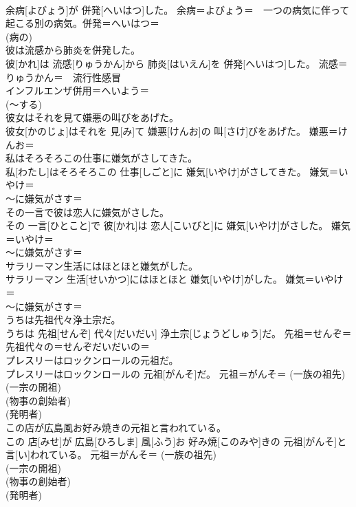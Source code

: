\documentclass[8pt]{extreport}
\begin{document}
\begin{CJK}{UTF8}{min}
{\\	余病[よびょう]が 併発[へいはつ]した。	余病＝よびょう＝　一つの病気に伴って起こる別の病気。併発＝へいはつ＝ 
\\	(病の) 
\\	彼は流感から肺炎を併発した。	
\\	彼[かれ]は 流感[りゅうかん]から 肺炎[はいえん]を 併発[へいはつ]した。	流感＝りゅうかん＝　流行性感冒 
\\	インフルエンザ併用＝へいよう＝ 
\\	(〜する) 
\\	彼女はそれを見て嫌悪の叫びをあげた。	
\\	彼女[かのじょ]はそれを 見[み]て 嫌悪[けんお]の 叫[さけ]びをあげた。	嫌悪＝けんお＝ 
\\	私はそろそろこの仕事に嫌気がさしてきた。	
\\	私[わたし]はそろそろこの 仕事[しごと]に 嫌気[いやけ]がさしてきた。	嫌気＝いやけ＝ 
\\	〜に嫌気がさす＝ 
\\	その一言で彼は恋人に嫌気がさした。	
\\	その 一言[ひとこと]で 彼[かれ]は 恋人[こいびと]に 嫌気[いやけ]がさした。	嫌気＝いやけ＝ 
\\	〜に嫌気がさす＝ 
\\	サラリーマン生活にはほとほと嫌気がした。	
\\	サラリーマン 生活[せいかつ]にはほとほと 嫌気[いやけ]がした。	嫌気＝いやけ＝ 
\\	〜に嫌気がさす＝ 
\\	うちは先祖代々浄土宗だ。	
\\	うちは 先祖[せんぞ] 代々[だいだい] 浄土宗[じょうどしゅう]だ。	先祖＝せんぞ＝ 
\\	先祖代々の＝せんぞだいだいの＝ 
\\	プレスリーはロックンロールの元祖だ。	
\\	プレスリーはロックンロールの 元祖[がんそ]だ。	元祖＝がんそ＝ (一族の祖先) 
\\	(一宗の開祖) 
\\	(物事の創始者) 
\\	(発明者) 
\\	この店が広島風お好み焼きの元祖と言われている。	
\\	この 店[みせ]が 広島[ひろしま] 風[ふう]お 好み焼[このみや]きの 元祖[がんそ]と 言[い]われている。	元祖＝がんそ＝ (一族の祖先) 
\\	(一宗の開祖) 
\\	(物事の創始者) 
\\	(発明者) 
}
\end{CJK}
\end{document}
